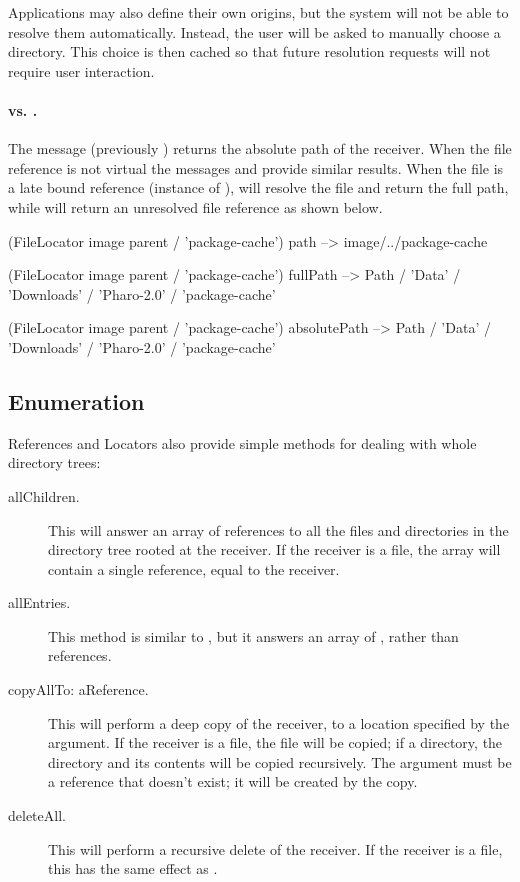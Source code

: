 \documentclass[a4paper,10pt,twoside]{book}
\begin{document}
Applications may also define their own origins, but the system will not be able to resolve them automatically. Instead, the user will be asked to manually choose a directory. This choice is then cached so that future resolution requests will not require user interaction.

\paragraph{ vs. .} The message   (previously ) returns the absolute path of the receiver. When the file reference is not virtual the messages  and  provide similar results.
When the file is a late bound reference (instance of ),  will resolve the file and return the full path, while  will return an unresolved file reference as shown below.


\begin{code}{}
(FileLocator image parent / 'package-cache') path
--> {image}/../package-cache

(FileLocator image parent / 'package-cache') fullPath
--> Path / 'Data' / 'Downloads' / 'Pharo-2.0' / 'package-cache'

(FileLocator image parent / 'package-cache') absolutePath
--> Path / 'Data' / 'Downloads' / 'Pharo-2.0' / 'package-cache'
\end{code}


\subsection{Enumeration}

References and Locators also provide simple methods for dealing with whole directory trees:

\begin{description}
\item[allChildren.]

This will answer an array of references to all the files and directories in the directory tree rooted at the receiver. If the receiver is a file, the array will contain a single reference, equal to the receiver.

\item[allEntries.]
This method is similar to , but it answers an array of , rather than references.

\item[copyAllTo: aReference.]

This will perform a deep copy of the receiver, to a location specified by the argument. If the receiver is a file, the file will be copied; if a directory, the directory and its contents will be copied recursively. The argument must be a reference that doesn't exist; it will be created by the copy.

\item[deleteAll.]

This will perform a recursive delete of the receiver. If the receiver is a file, this has the same effect as .
\end{description}
\end{document}

